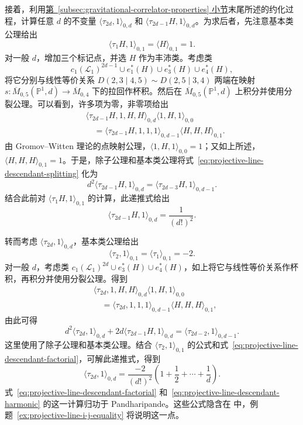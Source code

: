 \begin{example}
接着，利用\hyperref[subsec:gravitational-correlator-properties]{第~\ref*{subsec:gravitational-correlator-properties} 小节}末尾所述的约化过程，计算任意 $d$ 的不变量 $\langle\tau_{2d},1\rangle_{0,d}$ 和 $\langle\tau_{2d-1}H,1\rangle_{0,d}$。为求后者，先注意基本类公理给出
\[
\langle\tau_1H,1\rangle_{0,1}=\langle H\rangle_{0,1}=1.
\]
对一般 $d$，增加三个标记点，并选 $H$ 作为丰沛类。考虑类
\[
c_1(\mathcal L_1)^{2d-1}\cup e_1^*(H)\cup e_3^*(H)\cup e_4^*(H),
\]
将它分别与线性等价关系 $D(2,3\mid4,5)\sim D(2,5\mid3,4)$ 两端在映射 $s:\overline M_{0,5}(\mathbb P^1,d)\to\overline M_{0,4}$ 下的拉回作杯积。然后在 $\overline M_{0,5}(\mathbb P^1,d)$ 上积分并使用分裂公理。可以看到，许多项为零，非零项给出
\begin{equation}\label{eq:projective-line-descendant-splitting}
\begin{aligned}
&\langle\tau_{2d-1}H,1,H,H\rangle_{0,d}\langle1,H,1\rangle_{0,0}\\
&\quad=\langle\tau_{2d-1}H,1,1,1\rangle_{0,d-1}\langle H,H,H\rangle_{0,1}.
\end{aligned}
\end{equation}
由 Gromov--Witten 理论的点映射公理，$\langle1,H,1\rangle_{0,0}=1$；又如上所述，$\langle H,H,H\rangle_{0,1}=1$。于是，除子公理和基本类公理将式~\eqref{eq:projective-line-descendant-splitting} 化为
\[
d^2\langle\tau_{2d-1}H,1\rangle_{0,d}
=\langle\tau_{2d-3}H,1\rangle_{0,d-1}.
\]
结合此前对 $\langle\tau_1H,1\rangle_{0,1}$ 的计算，此递推式给出
\begin{equation}\label{eq:projective-line-descendant-factorial}
\langle\tau_{2d-1}H,1\rangle_{0,d}=\frac1{(d!)^2}.
\end{equation}

转而考虑 $\langle\tau_{2d},1\rangle_{0,d}$，基本类公理给出
\[
\langle\tau_2,1\rangle_{0,1}=\langle\tau_1\rangle_{0,1}=-2.
\]
对一般 $d$，考虑类 $c_1(\mathcal L_1)^{2d}\cup e_3^*(H)\cup e_4^*(H)$，如上将它与线性等价关系作杯积，再积分并使用分裂公理。得到
\[
\begin{aligned}
&\langle\tau_{2d},1,H,H\rangle_{0,d}\langle1,H,1\rangle_{0,0}\\
&\quad=\langle\tau_{2d},1,1,1\rangle_{0,d-1}\langle H,H,H\rangle_{0,1},
\end{aligned}
\]
由此可得
\[
d^2\langle\tau_{2d},1\rangle_{0,d}
+2d\langle\tau_{2d-1}H,1\rangle_{0,d}
=\langle\tau_{2d-2},1\rangle_{0,d-1}.
\]
这里使用了除子公理和基本类公理。结合 $\langle\tau_2,1\rangle_{0,1}$ 的公式和式~\eqref{eq:projective-line-descendant-factorial}，可解此递推式，得到
\begin{equation}\label{eq:projective-line-descendant-harmonic}
\langle\tau_{2d},1\rangle_{0,d}
=\frac{-2}{(d!)^2}\left(1+\frac12+\cdots+\frac1d\right).
\end{equation}
式~\eqref{eq:projective-line-descendant-factorial} 和~\eqref{eq:projective-line-descendant-harmonic} 的这一计算归功于 Pandharipande。这些公式隐含在  中，例题~\ref{ex:projective-line-i-j-equality} 将说明这一点。
\end{example}

